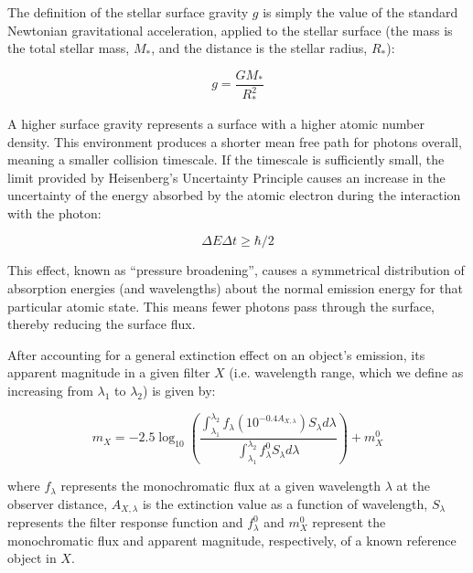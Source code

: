 \documentclass[12pt, a4paper]{report}
\begin{document}
The definition of the stellar surface gravity $g$ is simply the value of the standard Newtonian gravitational acceleration, applied to the stellar surface (the mass is the total stellar mass, $M_{*}$, and the distance is the stellar radius, $R_{*}$):

\begin{equation}
g = \frac{GM_{*}}{R_{*}^{2}}
\label{gravity_def}
\end{equation}

A higher surface gravity represents a surface with a higher atomic number density. This environment produces a shorter mean free path for photons overall, meaning a smaller collision timescale. If the timescale is sufficiently small, the limit provided by Heisenberg's Uncertainty Principle causes an increase in the uncertainty of the energy absorbed by the atomic electron during the interaction with the photon:

\begin{equation}
\Delta E \Delta t \geq \hbar/2
\label{heisenberg}
\end{equation}

This effect, known as ``pressure broadening'', causes a symmetrical distribution of absorption energies (and wavelengths) about the normal emission energy for that particular atomic state. This means fewer photons pass through the surface, thereby reducing the surface flux.

After accounting for a general extinction effect on an object's emission, its apparent magnitude in a given filter $X$ (i.e. wavelength range, which we define as increasing from $\lambda _{1}$ to $\lambda _{2}$) is given by:

\begin{equation}
m_{X} = -2.5 \log_{10} \left(\frac{ \int_{\lambda_{1}}^{\lambda_{2}} f_{\lambda} \left( 10^{-0.4 A_{X,\lambda}} \right) S_{\lambda} d\lambda }{ \int_{\lambda_{1}}^{\lambda_{2}} f_{\lambda}^{0} S_{\lambda} d\lambda }\right) + m_{X}^{0}
\label{app_mag_def}
\end{equation}

where $f_{\lambda}$ represents the monochromatic flux at a given wavelength $\lambda$ at the observer distance, $A_{X,\lambda}$ is the extinction value as a function of wavelength, $S_{\lambda}$ represents the filter response function and $f_{\lambda}^{0}$ and $m_{X}^{0}$ represent the monochromatic flux and apparent magnitude, respectively, of a known reference object in $X$.

\end{document}
